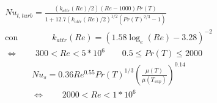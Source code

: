 \documentclass[a4paper,10pt]{article}                                                                                       %
\begin{document}
\begin{equation}                                                                                                            %
  \begin{aligned}                                                                                                           %
  \label{eqn:nu_pipe_t}                                                                                                     %
  Nu_{t,turb} = \frac{(k_{attr}(Re)/2)(Re-1000)Pr(T)}{1+12.7(k_{attr}(Re)/2)^{1/2}(Pr(T)^{2/3}-1)}                          %
  \\\text{con}\qquad\qquad                                                                                                  %
  k_{attr}(Re) = \left(1.58\log_e{(Re)}-3.28\right)^{-2}                                                                    %
  \\\Leftrightarrow\qquad                                                                                                   %
  300<Re<5*10^6\qquad0.5\le Pr(T)\le2000                                                                                    %
  \end{aligned}                                                                                                             %
\end{equation}                                                                                                              %
\vspace{3mm}                                                                                                                %
\begin{equation}                                                                                                            %
  \begin{aligned}                                                                                                           %
  \label{eqn:nu_shell}                                                                                                      %
  Nu_s = 0.36Re^{0.55}Pr(T)^{1/3}\left(\frac{\mu(T)}{\mu(T_{sup})}\right)^{0.14}                                            %
  \\\Leftrightarrow\qquad                                                                                                   %
  2000<Re<1*10^6\qquad\qquad                                                                                                %
  \end{aligned}                                                                                                             %
\end{equation}                                                                                                              %
\end{document}
